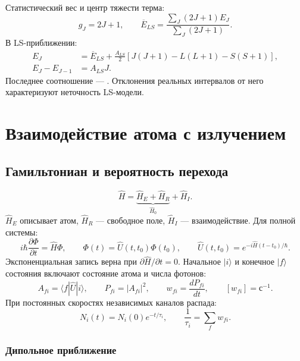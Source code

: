 \documentclass[../final.tex]{subfiles}
\begin{document}
Статистический вес и центр тяжести терма:
\begin{equation*}
    g_J=2J+1,\qquad
    \overline E_{LS}=\frac{\sum_J(2J+1)E_J}{\sum_J(2J+1)}.
\end{equation*}
В LS-приближении:
\begin{align*}
    E_J&=\overline E_{LS}+\frac{A_{LS}}2
       [J(J+1)-L(L+1)-S(S+1)],\\
    E_J-E_{J-1}&=A_{LS}J.
\end{align*}
Последнее соотношение --- .
Отклонения реальных интервалов от него характеризуют неточность LS-модели.

\chapter{Взаимодействие атома с излучением}

\section{Гамильтониан и вероятность перехода}

\begin{equation*}
    \hat H=\underbrace{\hat H_E+\hat H_R}_{\hat H_0}+\hat H_I.
\end{equation*}
\(\hat H_E\) описывает атом, \(\hat H_R\) --- свободное поле,
\(\hat H_I\) --- взаимодействие. Для полной системы:
\begin{equation*}
    i\hbar\frac{\partial\Phi}{\partial t}=\hat H\Phi,\qquad
    \Phi(t)=\hat U(t,t_0)\Phi(t_0),\qquad
    \hat U(t,t_0)=e^{-i\hat H(t-t_0)/\hbar}.
\end{equation*}
Экспоненциальная запись верна при \(\partial\hat H/\partial t=0\).
Начальное \(|i\rangle\) и конечное \(|f\rangle\) состояния
включают состояние атома и числа фотонов:
\begin{equation*}
    A_{fi}=\langle f|\hat U|i\rangle,\qquad
    P_{fi}=|A_{fi}|^2,\qquad
    w_{fi}=\frac{dP_{fi}}{dt},\qquad [w_{fi}]=\text{с}^{-1}.
\end{equation*}
При постоянных скоростях независимых каналов распада:
\begin{equation*}
    N_i(t)=N_i(0)e^{-t/\tau_i},\qquad
    \frac1{\tau_i}=\sum_f w_{fi}.
\end{equation*}

\subsection{Дипольное приближение}
\end{document}
